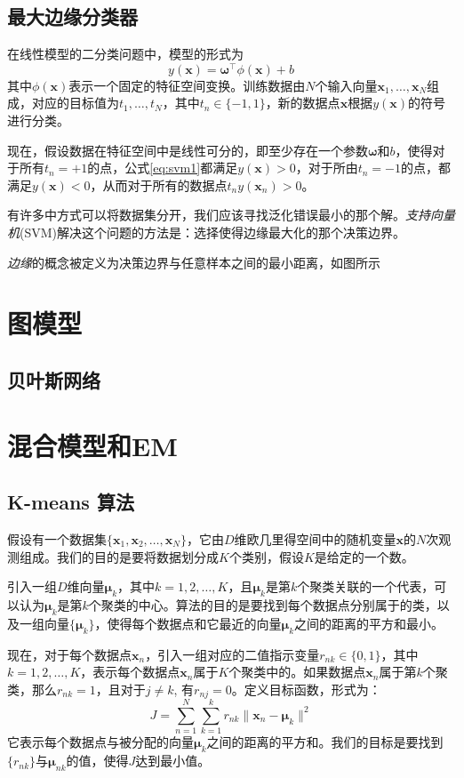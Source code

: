 \documentclass[11pt]{ctexbook}
\begin{document}
\section{最大边缘分类器}
在线性模型的二分类问题中，模型的形式为
\begin{equation}
	\label{eq:svm1}
	y(\bm x) = \bm \omega^\top\phi(\bm x) + b
\end{equation}
其中$\phi(\bm x)$表示一个固定的特征空间变换。训练数据由$N$个输入向量$\bm x_1, \ldots,\bm x_N$组成，对应的目标值为$t_1, \ldots, t_N$，其中$t_n \in \{ -1, 1\}$，新的数据点$\bm x$根据$y(\bm x)$的符号进行分类。

现在，假设数据在特征空间中是线性可分的，即至少存在一个参数$\bm \omega$和$b$，使得对于所有$t_n=+1$的点，公式\ref{eq:svm1}都满足$y(\bm x) > 0$，对于所由$t_n = -1$的点，都满足$y(\bm x) < 0$，从而对于所有的数据点$t_n y(\bm x_n) > 0$。

有许多中方式可以将数据集分开，我们应该寻找泛化错误最小的那个解。\emph{支持向量机}(SVM)解决这个问题的方法是：选择使得边缘最大化的那个决策边界。

\emph{边缘}的概念被定义为决策边界与任意样本之间的最小距离，如图所示

\chapter{图模型}
\section{贝叶斯网络}

\chapter{混合模型和EM}
\section{K-means 算法}
假设有一个数据集$\{ \bm x_1, \bm x_2, \ldots, \bm x_N\}$，它由$D$维欧几里得空间中的随机变量$\bm x$的$N$次观测组成。我们的目的是要将数据划分成$K$个类别，假设$K$是给定的一个数。

引入一组$D$维向量$\bm \mu_k$，其中$k=1, 2, \ldots, K$，且$\bm \mu_k$是第$k$个聚类关联的一个代表，可以认为$\bm \mu_k$是第$k$个聚类的中心。算法的目的是要找到每个数据点分别属于的类，以及一组向量$\{\bm \mu_k\}$，使得每个数据点和它最近的向量$\bm \mu_k$之间的距离的平方和最小。

现在，对于每个数据点$\bm x_n$，引入一组对应的二值指示变量$r_{nk} \in \{0, 1\}$，其中 $k = 1, 2, \ldots, K$，表示每个数据点$\bm x_n$属于$K$个聚类中的。如果数据点$\bm x_n$属于第$k$个聚类，那么$r_{nk}=1$，且对于$j \neq k$, 有$r_{nj} = 0$。定义目标函数，形式为：
\begin{equation}
	\label{eq:kmeas-cost}
	J = \sum_{n=1}^{N}\sum_{k=1}^{k}r_{nk}\| \bm x_n - \bm \mu_k \|^2
\end{equation}
它表示每个数据点与被分配的向量$\bm \mu_k$之间的距离的平方和。我们的目标是要找到$\{r_{nk}\}$与$\bm \mu_{nk}$的值，使得$J$达到最小值。
\end{document}
